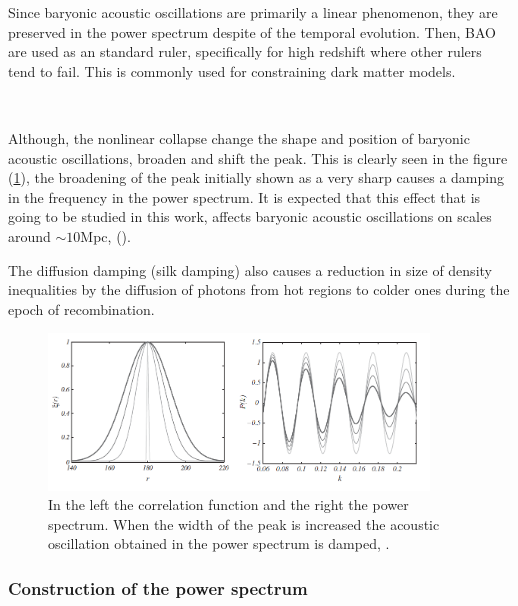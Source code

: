 \documentclass[a4,useAMS,usegraphicx,12pt]{article}
\begin{document}
Since baryonic acoustic oscillations are primarily a linear phenomenon, they are preserved in the power spectrum despite of 
the temporal evolution. Then,  BAO are used as an standard ruler, specifically for high redshift where other rulers tend to fail. 
This is commonly used for constraining dark matter models. 

\

Although, the nonlinear collapse change the shape and position of baryonic acoustic oscillations, broaden and shift the 
peak. This is clearly seen in the figure (\ref{peak}), the broadening of the peak initially shown as a very sharp causes 
a damping in the frequency in the power spectrum. It is expected that this effect that is going to be studied in this work, affects baryonic 
acoustic oscillations on scales around $\sim 10$Mpc, (\cite{10MPC}). 

The diffusion damping (silk damping)  also causes a reduction in size of density inequalities by the diffusion of photons from 
hot regions to colder ones during the epoch of recombination. 

\begin{figure}[htbp]
       \centering
               \includegraphics[width=0.9\textwidth]{Images/width.png}
       \caption{\small In the left the correlation function and the right the power spectrum. When the width of the peak is increased
       the acoustic oscillation obtained in the power spectrum is damped, \cite{pilar}.    }
       \label{peak}
 \end{figure}


\subsubsection*{ Construction of the power spectrum }
\label{subsubsec:CPS}
\end{document}

